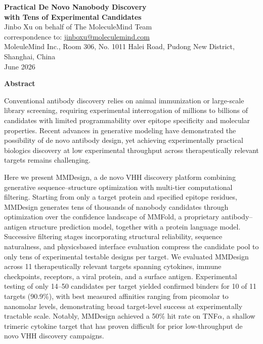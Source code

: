 \documentclass[11pt]{article}
\begin{document}
\thispagestyle{empty}
\begin{center}
{\Large\bfseries Practical De Novo Nanobody Discovery\\[3pt] with Tens of Experimental Candidates}\\[14pt]
{\large Jinbo Xu on behalf of The MoleculeMind Team}\\[6pt]
correspondence to: \url{jinboxu@moleculemind.com}\\[4pt]
MoleuleMind Inc., Room 306, No. 1011 Halei Road, Pudong New District, Shanghai, China\\[6pt]
June 2026
\end{center}

\vspace{2ex}
\begin{center}\textbf{Abstract}\end{center}

Conventional antibody discovery relies on animal immunization or large-scale library screening,
requiring experimental interrogation of millions to billions of candidates with limited programmability over epitope specificity and molecular properties. Recent advances in generative
modeling have demonstrated the possibility of de novo antibody design, yet achieving experimentally practical biologics discovery at low experimental throughput across therapeutically
relevant targets remains challenging.

Here we present MMDesign, a de novo VHH discovery platform combining generative
sequence--structure optimization with multi-tier computational filtering. Starting from only
a target protein and specified epitope residues, MMDesign generates tens of thousands of
nanobody candidates through optimization over the confidence landscape of MMFold, a proprietary antibody--antigen structure prediction model, together with a protein language model.
Successive filtering stages incorporating structural reliability, sequence naturalness, and physicsbased interface evaluation compress the candidate pool to only tens of experimental testable
designs per target. We evaluated MMDesign across 11 therapeutically relevant targets spanning
cytokines, immune checkpoints, receptors, a viral protein, and a surface antigen. Experimental
testing of only 14--50 candidates per target yielded confirmed binders for 10 of 11 targets (90.9\%),
with best measured affinities ranging from picomolar to nanomolar levels, demonstrating broad
target-level success at experimentally tractable scale. Notably, MMDesign achieved a 50\% hit rate
on TNF$\alpha$, a shallow trimeric cytokine target that has proven difficult for prior low-throughput de
novo VHH discovery campaigns.
\end{document}

